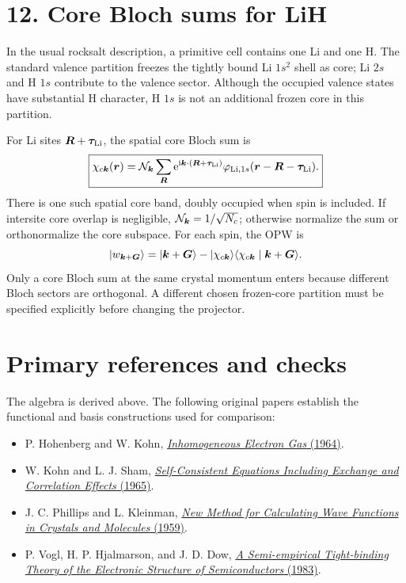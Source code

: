 \section*{12. Core Bloch sums for LiH}
In the usual rocksalt description, a primitive cell contains one Li and one H. The standard valence partition freezes the tightly bound Li $1s^2$ shell as core; Li $2s$ and H $1s$ contribute to the valence sector. Although the occupied valence states have substantial H character, H $1s$ is not an additional frozen core in this partition.

For Li sites $\boldsymbol{R}+\boldsymbol{\tau}_{\mathrm{Li}}$, the spatial core Bloch sum is
\[
\boxed{\chi_{c\boldsymbol{k}}(\boldsymbol{r})=\mathcal N_{\boldsymbol{k}}\sum_{\boldsymbol{R}}
\mathrm{e}^{\mathrm{i}\boldsymbol{k}\cdot(\boldsymbol{R}+\boldsymbol{\tau}_{\mathrm{Li}})}
\varphi_{\mathrm{Li},1s}(\boldsymbol{r}-\boldsymbol{R}-\boldsymbol{\tau}_{\mathrm{Li}}).}
\]
There is one such spatial core band, doubly occupied when spin is included. If intersite core overlap is negligible, $\mathcal N_{\boldsymbol{k}}=1/\sqrt{N_c}$; otherwise normalize the sum or orthonormalize the core subspace. For each spin, the OPW is
\[
\lvert w_{\boldsymbol{k}+\boldsymbol{G}}\rangle=\lvert\boldsymbol{k}+\boldsymbol{G}\rangle
-\lvert\chi_{c\boldsymbol{k}}\rangle\langle\chi_{c\boldsymbol{k}}\mid\boldsymbol{k}+\boldsymbol{G}\rangle.
\]
Only a core Bloch sum at the same crystal momentum enters because different Bloch sectors are orthogonal. A different chosen frozen-core partition must be specified explicitly before changing the projector.

\section*{Primary references and checks}
The algebra is derived above. The following original papers establish the functional and basis constructions used for comparison:
\begin{itemize}
\item P. Hohenberg and W. Kohn, \href{https://doi.org/10.1103/PhysRev.136.B864}{\textit{Inhomogeneous Electron Gas} (1964)}.
\item W. Kohn and L. J. Sham, \href{https://doi.org/10.1103/PhysRev.140.A1133}{\textit{Self-Consistent Equations Including Exchange and Correlation Effects} (1965)}.
\item J. C. Phillips and L. Kleinman, \href{https://doi.org/10.1103/PhysRev.116.287}{\textit{New Method for Calculating Wave Functions in Crystals and Molecules} (1959)}.
\item P. Vogl, H. P. Hjalmarson, and J. D. Dow, \href{https://doi.org/10.1016/0022-3697(83)90064-1}{\textit{A Semi-empirical Tight-binding Theory of the Electronic Structure of Semiconductors} (1983)}.
\end{itemize}
